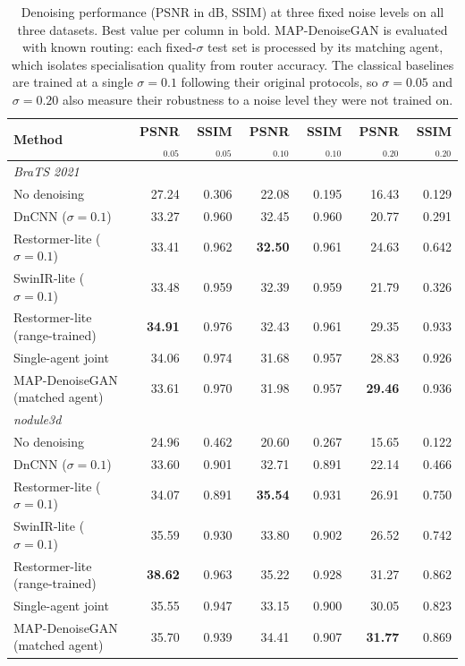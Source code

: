 \begin{table}[!t]
\centering
\caption{Denoising performance (PSNR in dB, SSIM) at three fixed noise levels on all three datasets. Best value per column in bold. MAP-DenoiseGAN is evaluated with known routing: each fixed-$\sigma$ test set is processed by its matching agent, which isolates specialisation quality from router accuracy. The classical baselines are trained at a single $\sigma=0.1$ following their original protocols, so $\sigma=0.05$ and $\sigma=0.20$ also measure their robustness to a noise level they were not trained on.}
\label{tab:main}
\begin{tabular}{lrrrrrr}
\toprule
Method & PSNR$_{0.05}$ & SSIM$_{0.05}$ & PSNR$_{0.10}$ & SSIM$_{0.10}$ & PSNR$_{0.20}$ & SSIM$_{0.20}$ \\
\midrule
\multicolumn{7}{l}{\textit{BraTS 2021}} \\
No denoising & 27.24 & 0.306 & 22.08 & 0.195 & 16.43 & 0.129 \\
DnCNN ($\sigma{=}0.1$) & 33.27 & 0.960 & 32.45 & 0.960 & 20.77 & 0.291 \\
Restormer-lite ($\sigma{=}0.1$) & 33.41 & 0.962 & \textbf{32.50} & 0.961 & 24.63 & 0.642 \\
SwinIR-lite ($\sigma{=}0.1$) & 33.48 & 0.959 & 32.39 & 0.959 & 21.79 & 0.326 \\
Restormer-lite (range-trained) & \textbf{34.91} & 0.976 & 32.43 & 0.961 & 29.35 & 0.933 \\
Single-agent joint & 34.06 & 0.974 & 31.68 & 0.957 & 28.83 & 0.926 \\
MAP-DenoiseGAN (matched agent) & 33.61 & 0.970 & 31.98 & 0.957 & \textbf{29.46} & 0.936 \\
\midrule
\multicolumn{7}{l}{\textit{nodule3d}} \\
No denoising & 24.96 & 0.462 & 20.60 & 0.267 & 15.65 & 0.122 \\
DnCNN ($\sigma{=}0.1$) & 33.60 & 0.901 & 32.71 & 0.891 & 22.14 & 0.466 \\
Restormer-lite ($\sigma{=}0.1$) & 34.07 & 0.891 & \textbf{35.54} & 0.931 & 26.91 & 0.750 \\
SwinIR-lite ($\sigma{=}0.1$) & 35.59 & 0.930 & 33.80 & 0.902 & 26.52 & 0.742 \\
Restormer-lite (range-trained) & \textbf{38.62} & 0.963 & 35.22 & 0.928 & 31.27 & 0.862 \\
Single-agent joint & 35.55 & 0.947 & 33.15 & 0.900 & 30.05 & 0.823 \\
MAP-DenoiseGAN (matched agent) & 35.70 & 0.939 & 34.41 & 0.907 & \textbf{31.77} & 0.869 \\

\end{tabular}
\end{table}
